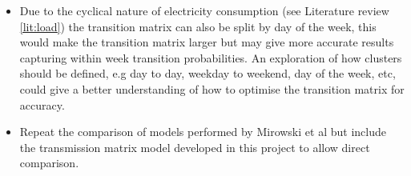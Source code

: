 \begin{itemize}
    \item Due to the cyclical nature of electricity consumption (see Literature review \ref{lit:load}) the transition matrix can also be split by day of the week, this would make the transition matrix larger but may give more accurate results capturing within week transition probabilities. An exploration of how clusters should be defined, e.g day to day, weekday to weekend, day of the week, etc, could give a better understanding of how to optimise the transition matrix for accuracy.
    
    \item Repeat the comparison of models performed by Mirowski et al \cite{mirowski2014} but include the transmission matrix model developed in this project to allow direct comparison.
\end{itemize}